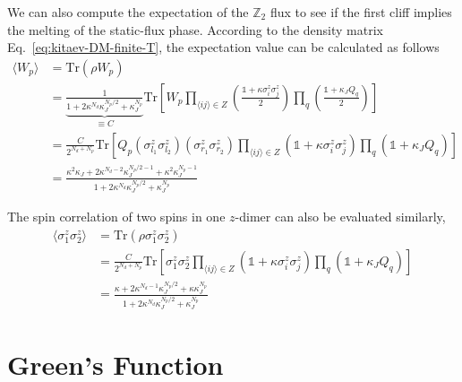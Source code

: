 \documentclass[12font]{article}
\numberwithin{equation}{section}    %
\theoremstyle{definition}
\newcommand{\anglelr}[1]{\langle #1 \rangle}
\newcommand{\lr}[1]{\left(  #1  \right)}
\newcommand{\lrm}[1]{\left[  #1  \right]}
\newcommand{\mrm}[1]{\mathrm{#1}}
\newcommand{\Tr}{\mrm{Tr}}
\begin{document}
We can also compute the expectation of the $\mathbb{Z}_2$ flux to see if the first cliff implies the melting of the static-flux phase. According to the density matrix Eq.~\eqref{eq:kitaev-DM-finite-T}, the expectation value can be calculated as follows
\begin{align}\label{eq:finite-T-flux}
    \anglelr{W_p} 
    &= 
    \Tr\lr{\rho W_p} \nonumber \\
    &= 
    \underbrace{
    \frac{1}{1 + 2\kappa^{N_d}\kappa_J^{N_p/2} + \kappa_J^{N_p}}
    }_{\equiv C}
    \Tr\lrm{
        W_p
        \prod_{\anglelr{ij} \in Z} \lr{\frac{\mathds{1} + \kappa \sigma^z_i\sigma^z_j}{2}}
        \prod_{q}\lr{\frac{\mathds{1} + \kappa_J Q_q}{2}} 
    } \nonumber \\
    &=
    \frac{C}{2^{N_d + N_p}}
    \Tr\lrm{
    Q_p 
    \lr{\sigma^z_{l_1}\sigma^z_{l_2}}
    \lr{\sigma^z_{r_1}\sigma^z_{r_2}}
        \prod_{\anglelr{ij} \in Z} \lr{\mathds{1} + \kappa \sigma^z_i\sigma^z_j}
        \prod_{q}\lr{\mathds{1} + \kappa_J Q_q} 
    } \nonumber \\
    &= 
    \frac{
        \kappa^2\kappa_J 
        + 
        2 \kappa^{N_d-2} \kappa_J^{N_p/2 - 1}
        +
        \kappa^2 \kappa_J^{N_p - 1}
    }
    {
        1 + 2\kappa^{N_d}\kappa_J^{N_p/2} + \kappa_J^{N_p}
    }
\end{align}

The spin correlation of two spins in one $z$-dimer can also be evaluated similarly,
\begin{align}\label{eq:finite-T-Kitaev-ss}
    \anglelr{\sigma^z_1 \sigma^z_2} 
    &=
    \Tr\lr{\rho \sigma^z_1\sigma^z_2} \nonumber \\
    &= 
    \frac{C}{2^{N_d + N_p}}
    \Tr\lrm{
    \sigma^z_1\sigma^z_2
        \prod_{\anglelr{ij} \in Z} \lr{\mathds{1} + \kappa \sigma^z_i\sigma^z_j}
        \prod_{q}\lr{\mathds{1} + \kappa_J Q_q} 
    }  \nonumber \\
    &=
    \frac{
        \kappa + 2\kappa^{N_d-1}\kappa_J^{N_p/2} + \kappa \kappa_J^{N_p}
    }
    {
        1 + 2\kappa^{N_d}\kappa_J^{N_p/2} + \kappa_J^{N_p}
    }
\end{align}

\section{Green's Function}
\cite{Takegami-Morinari_2025}


\appendix
\end{document}
